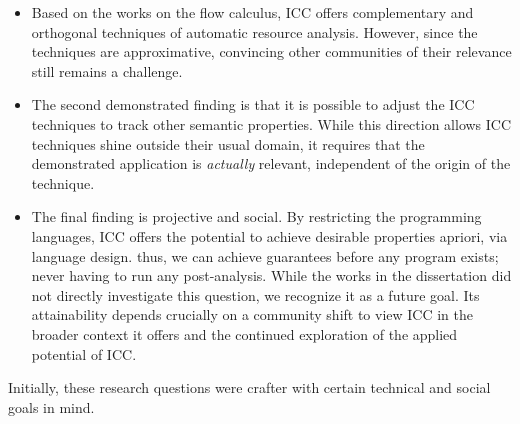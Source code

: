 \begin{itemize}
\item Based on the works on the flow calculus, ICC offers complementary and orthogonal techniques of automatic resource analysis.
However, since the techniques are approximative, convincing other communities of their relevance still remains a challenge.

\item The second demonstrated finding is that it is possible to adjust the ICC techniques to track other semantic properties.
While this direction allows ICC techniques shine outside their usual domain, it requires that the demonstrated application is \emph{actually} relevant, independent of the origin of the technique.

\item The final finding is projective and social.
By restricting the programming languages, ICC offers the potential to achieve desirable properties apriori, via language design.
thus, we can achieve guarantees before any program exists;
never having to run any post-analysis.
While the works in the dissertation did not directly investigate this question, we recognize it as a future goal.
Its attainability depends crucially on a community shift to view ICC in the broader context it offers and the continued exploration of the applied potential of ICC.
\end{itemize}
Initially, these research questions were crafter with certain technical and social goals in mind.
